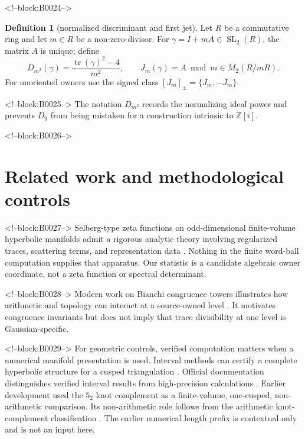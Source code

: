 \documentclass[11pt,a4paper]{article}
\theoremstyle{definition}
\newtheorem{definition}[theorem]{Definition}
\theoremstyle{remark}
\newcommand{\SL}{\operatorname{SL}}
\newcommand{\tr}{\operatorname{tr}}
\newcommand{\Gauss}{\mathbb{Z}[i]}
\begin{document}
<!--block:B0024-->
\begin{definition}[normalized discriminant and first jet]
Let \(R\) be a commutative ring and let \(m\in R\) be a non-zero-divisor.
For \(\gamma=I+mA\in\SL_2(R)\), the matrix \(A\) is unique; define
\[
 D_{m^2}(\gamma)=\frac{\tr(\gamma)^2-4}{m^2},
 \qquad J_m(\gamma)=A\bmod m\in M_2(R/mR).
\]
For unoriented owners use the signed class \([J_m]_{\pm}=\{J_m,-J_m\}\).
\end{definition}

<!--block:B0025-->
The notation \(D_{m^2}\) records the normalizing ideal power and prevents \(D_9\) from being mistaken for a construction intrinsic to \(\Gauss\).

<!--block:B0026-->
\section{Related work and methodological controls}

<!--block:B0027-->
Selberg-type zeta functions on odd-dimensional finite-volume hyperbolic manifolds admit a rigorous analytic theory involving regularized traces, scattering terms, and representation data \citep[abstract and Secs.~3--5]{Pfaff2015}. Nothing in the finite word-ball computation supplies that apparatus. Our statistic is a candidate algebraic owner coordinate, not a zeta function or spectral determinant.

<!--block:B0028-->
Modern work on Bianchi congruence towers illustrates how arithmetic and topology can interact at a source-owned level \citep[Introduction and Sec.~2]{PfaffRaimbault2020}. It motivates congruence invariants but does not imply that trace divisibility at one level is Gaussian-specific.

<!--block:B0029-->
For geometric controls, verified computation matters when a numerical manifold presentation is used.
Interval methods can certify a complete hyperbolic structure for a cusped triangulation \citep[Thm.~5.1 and Secs.~3--5]{HIKMOT2016}.
Official documentation distinguishes verified interval results from high-precision calculations \citep[verified computations and \texttt{verify\_hyperbolicity}]{SnapPyDocs2026}.
Earlier development used the \(5_2\) knot complement as a finite-volume, one-cusped, non-arithmetic comparison.
Its non-arithmetic role follows from the arithmetic knot-complement classification \citep[main theorem]{Reid1991}. The earlier numerical length prefix is contextual only and is not an input here.
\end{document}
